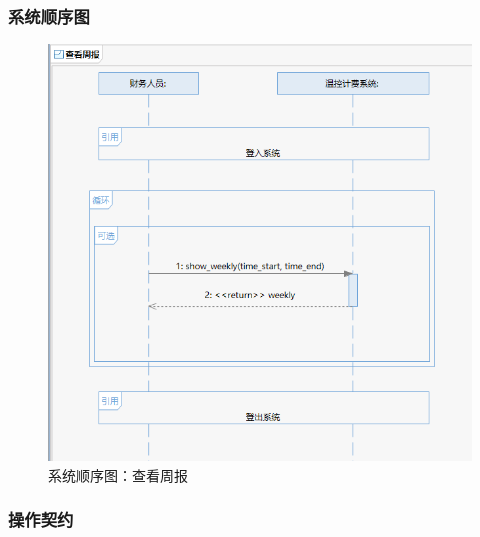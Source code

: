 \documentclass[black,normal,cn]{elegantnote}
\begin{document}
\subsubsection{系统顺序图}
\begin{figure}[H]
    \centering
    \includegraphics[width=.8\textwidth]{fig/276013.png}
    \caption{系统顺序图：查看周报}
    \label{fig:276002}
\end{figure}

\subsubsection{操作契约}
\end{document}
